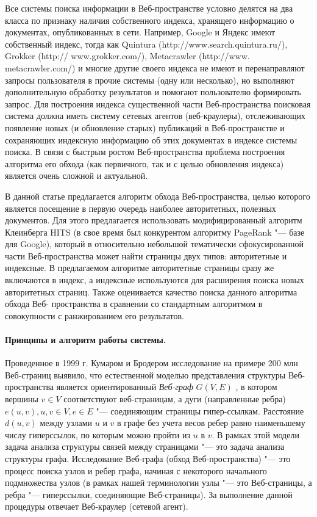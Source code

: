 Все системы поиска информации в Веб-пространстве условно делятся на два класса по признаку наличия собственного индекса, хранящего информацию о документах, опубликованных в сети. Например, Google и Яндекс имеют собственный индекс, тогда как Quintura (http://www.search.quintura.ru/), Grokker (http:// www.grokker.com/), Metacrawler (http://www. metacrawler.com/) и многие другие своего индекса не имеют и перенаправляют запросы пользователя в прочие системы (одну или несколько), но выполняют дополнительную обработку результатов и помогают пользователю формировать запрос. Для построения индекса существенной части Веб-пространства поисковая система должна иметь систему сетевых агентов (веб-краулеры), отслеживающих появление новых (и обновление старых) публикаций в Веб-пространстве и сохраняющих индексную информацию об этих документах в индексе системы поиска. В связи с быстрым ростом Веб-пространства \cite{Kahle,HubermanAdamic} проблема построения алгоритма его обхода (как первичного, так и с целью обновления индекса) является очень сложной и актуальной.

В данной статье предлагается алгоритм обхода Веб-пространства, целью которого является посещение в первую очередь наиболее авторитетных, полезных документов. Для этого предлагается использовать модифицированный алгоритм Клеинберга HITS (в свое время был конкурентом алгоритму PageRank "--- базе для Google), который в относительно небольшой тематически сфокусированной части Веб-пространства может найти страницы двух типов: авторитетные и индексные. В предлагаемом алгоритме авторитетные страницы сразу же включаются в индекс, а индексные используются для расширения поиска новых авторитетных страниц. Также оценивается качество поиска данного алгоритма обхода Веб- пространства в сравнении со стандартным алгоритмом в совокупности с ранжированием его результатов.

\paragraph{Принципы и алгоритм работы системы.} Проведенное в 1999 г. Кумаром и Бродером исследование \cite{BroderKumarMaghoul} на примере 200 млн Веб-страниц выявило, что естественной моделью представления структуры Веб-пространства является ориентированный \textit{Веб-граф} \(G(V,E)\) \cite{BroderKumarMaghoul}, в котором вершины \(v \in V\) соответствуют веб-страницам, а дуги (направленные ребра) \(e(u, v), u, v \in V, e \in E\) "--- соединяющим страницы гипер-ссылкам. Расстояние \(d(u, v)\) между узлами \(u\) и \(v\) в графе без учета весов ребер равно наименьшему числу гиперссылок, по которым можно пройти из \(u\) в \(v\). В рамках этой модели задача анализа структуры связей между страницами "--- это задача анализа структуры графа. Исследование Веб-графа (обход Веб-пространства) "--- это процесс поиска узлов и ребер графа, начиная с некоторого начального подмножества узлов (в рамках нашей терминологии узлы "--- это Веб-страницы, а ребра "--- гиперссылки, соединяющие Веб-страницы). За выполнение данной процедуры отвечает Веб-краулер (сетевой агент).


